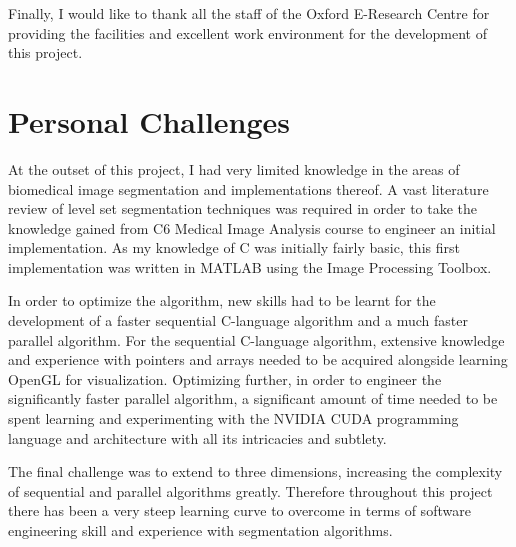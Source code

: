 \documentclass[a4paper,oneside,11pt]{book}
\begin{document}
Finally, I would like to thank all the staff of the Oxford E-Research Centre for providing the facilities and excellent work environment for the development of this project.

\section*{Personal Challenges}
At the outset of this project, I had very limited knowledge in the areas of biomedical image segmentation and implementations thereof. A vast literature review of level set segmentation techniques was required in order to take the knowledge gained from C6 Medical Image Analysis course to engineer an initial implementation. As my knowledge of C was initially fairly basic, this first implementation was written in MATLAB using the Image Processing Toolbox.

In order to optimize the algorithm, new skills had to be learnt for the development of a faster sequential C-language algorithm and a much faster parallel algorithm. For the sequential C-language algorithm, extensive knowledge and experience with pointers and arrays needed to be acquired alongside learning OpenGL for visualization. Optimizing further, in order to engineer the significantly faster parallel algorithm, a significant amount of time needed to be spent learning and experimenting with the NVIDIA CUDA programming language and architecture with all its intricacies and subtlety. 

The final challenge was to extend to three dimensions, increasing the complexity of sequential and parallel algorithms greatly. Therefore throughout this project there has been a very steep learning curve to overcome in terms of software engineering skill and experience with segmentation algorithms.


\setcounter{tocdepth}{1}
\begin{spacing}{1.2}
\tableofcontents
\end{spacing}

\mainmatter






\begin{spacing}{1.2}
\nocite{3dfinitedifference}\nocite{brainweb}\nocite{chan2001acw}\nocite{cuda}\nocite{difi}\nocite{gist}\nocite{goodman}\nocite{gpgpudistance}\nocite{gui2005lse}\nocite{ibanez:isg}\nocite{kharlamov:id}\nocite{klar:igb}\nocite{Lefohn04astreaming}\nocite{mgiles}\nocite{narrowband}\nocite{nvidia2008cud}\nocite{osher2003lsm}\nocite{oshersethian}\nocite{rumpf2001lss}\nocite{sethian2003lsm}\nocite{sharma17cbl}\nocite{sparsefield}\nocite{nguyen2007gg}


\end{spacing}




\begin{spacing}{1.18}


\end{spacing}
\end{document}
